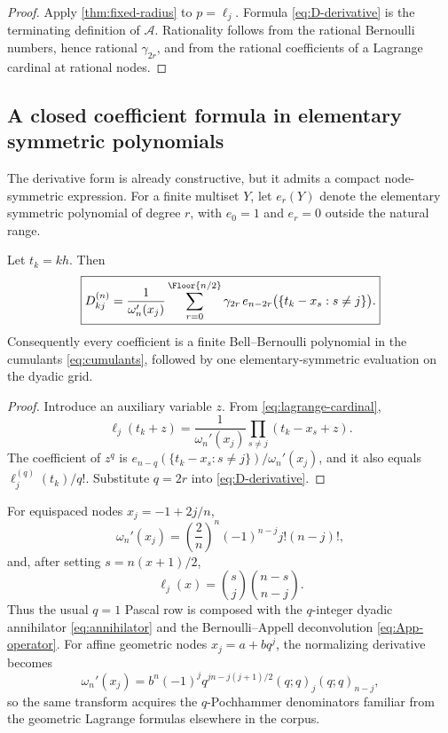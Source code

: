 \documentclass[11pt,oneside]{article}
\numberwithin{equation}{section}
\theoremstyle{definition}
\theoremstyle{remark}
\newcommand{\App}{\mathscr A}
\begin{document}
\begin{proof}
Apply \cref{thm:fixed-radius} to $p=\ell_j$.  Formula
\eqref{eq:D-derivative} is the terminating definition of $\App$.
Rationality follows from the rational Bernoulli numbers, hence rational
$\gamma_{2r}$, and from the rational coefficients of a Lagrange cardinal at
rational nodes.
\end{proof}

\subsection{A closed coefficient formula in elementary symmetric polynomials}

The derivative form is already constructive, but it admits a compact
node-symmetric expression.  For a finite multiset $Y$, let $e_r(Y)$ denote
the elementary symmetric polynomial of degree $r$, with $e_0=1$ and
$e_r=0$ outside the natural range.

\begin{proposition}
\label{prop:symmetric-coeff}
Let $t_k=kh$.  Then
\begin{equation}
 \boxed{
 D_{kj}^{(n)}=
 \frac{1}{\omega_n'(x_j)}
 \sum_{r=0}^{\Floor{n/2}}\gamma_{2r}\,
 e_{n-2r}\bigl(\{t_k-x_s:s\ne j\}\bigr).
 }
 \label{eq:D-elementary}
\end{equation}
Consequently every coefficient is a finite Bell--Bernoulli polynomial in the
cumulants \eqref{eq:cumulants}, followed by one elementary-symmetric
evaluation on the dyadic grid.
\end{proposition}

\begin{proof}
Introduce an auxiliary variable $z$.  From \eqref{eq:lagrange-cardinal},
\[
 \ell_j(t_k+z)
 =\frac1{\omega_n'(x_j)}\prod_{s\ne j}(t_k-x_s+z).
\]
The coefficient of $z^q$ is
$e_{n-q}(\{t_k-x_s:s\ne j\})/\omega_n'(x_j)$, and it also equals
$\ell_j^{(q)}(t_k)/q!$.  Substitute $q=2r$ into
\eqref{eq:D-derivative}.
\end{proof}

For equispaced nodes $x_j=-1+2j/n$,
\begin{equation}
 \omega_n'(x_j)=\left(\frac2n\right)^n(-1)^{n-j}j!(n-j)!,
 \label{eq:equispaced-omega-prime}
\end{equation}
and, after setting $s=n(x+1)/2$,
\begin{equation}
 \ell_j(x)=\binom{s}{j}\binom{n-s}{n-j}.
 \label{eq:equispaced-cardinal-binomial}
\end{equation}
Thus the usual $q=1$ Pascal row is composed with the $q$-integer dyadic
annihilator \eqref{eq:annihilator} and the Bernoulli--Appell deconvolution
\eqref{eq:App-operator}.  For affine geometric nodes $x_j=a+bq^j$, the
normalizing derivative becomes
\begin{equation}
 \omega_n'(x_j)=b^n(-1)^j
 q^{jn-j(j+1)/2}(q;q)_j(q;q)_{n-j},
 \label{eq:q-node-omega}
\end{equation}
so the same transform acquires the $q$-Pochhammer denominators familiar from
the geometric Lagrange formulas elsewhere in the corpus.
\end{document}
